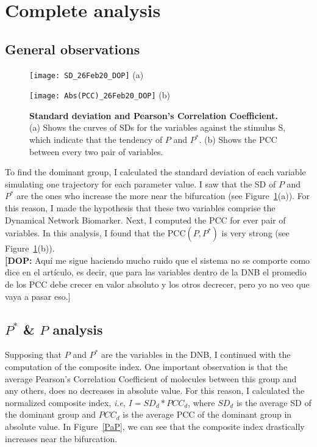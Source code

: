 \documentclass[12pt,twoside]{book}
\newcommand{\dop}[1]{{\color{jade}  \textbf{[DOP:} #1]}}
\begin{document}
\section*{Complete analysis}

\subsection*{General observations}

\begin{figure}[h]
\begin{minipage}[b]{0.5\linewidth}
\centering
\texttt{[image: SD\_26Feb20\_DOP]}
    \small{(a)} 
\end{minipage}
\hspace{0.5cm}
\begin{minipage}[b]{0.5\linewidth}
\centering
\texttt{[image: Abs(PCC)\_26Feb20\_DOP]}
    \small{(b)} 
\end{minipage}
\caption{\textbf{Standard deviation and Pearson's Correlation Coefficient.} (a) Shows the curves of SDs for the variables against the stimulus S, which indicate that the tendency of $P$ and $P^*$. (b) Shows the PCC between every two pair of variables.}
\label{FisrtsObs}
\end{figure}

To find the dominant group, I calculated the standard deviation of each variable simulating one trajectory for each parameter value. I saw that the SD of $P$ and $P^*$ are the ones who increase the more near the bifurcation (see Figure~\ref{FisrtsObs}(a)). For this reason, I made the hypothesis that these two variables comprise the Dynamical Network Biomarker. Next, I computed the PCC for ever pair of variables. In this analysis, I found that the PCC$(P,P^*)$ is very strong (see Figure~\ref{FisrtsObs}(b)). \\

\dop{Aquí me sigue haciendo mucho ruido que el sistema no se comporte como dice en el artículo, es decir, que para las variables dentro de la DNB el promedio de los PCC debe crecer en valor absoluto y los otros decrecer, pero yo no veo que vaya a pasar eso.}

\subsection*{$P^*$ \& $P$ analysis}

Supposing that $P$ and $P^*$ are the variables in the DNB, I continued with the computation of the composite index. One important observation is that the average Pearson's Correlation Coefficient of molecules between this group and any others, does no decreases in absolute value. For this reason, I calculated the normalized composite index, \textit{i.e}, $I = SD_d*PCC_d$, where $SD_d$ is the average SD of the dominant group and $PCC_d$ is the average PCC of the dominant group in absolute value. In Figure~\ref{PaP}, we can see that the composite index drastically increases near the bifurcation.
\end{document}
